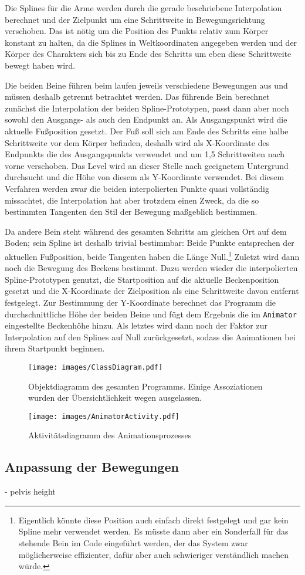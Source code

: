 Die Splines für die Arme werden durch die gerade beschriebene Interpolation berechnet und der Zielpunkt um eine Schrittweite in Bewegungsrichtung verschoben. Das ist nötig um die Position des Punkts relativ zum Körper konstant zu halten, da die Splines in Weltkoordinaten angegeben werden und der Körper des Charakters sich bis zu Ende des Schritts um eben diese Schrittweite bewegt haben wird.

Die beiden Beine führen beim laufen jeweils verschiedene Bewegungen aus und müssen deshalb getrennt betrachtet werden. Das führende Bein berechnet zunächst die Interpolation der beiden Spline-Prototypen, passt dann aber noch sowohl den Ausgangs- als auch den Endpunkt an. Als Ausgangspunkt wird die aktuelle Fußposition gesetzt. Der Fuß soll sich am Ende des Schritts eine halbe Schrittweite vor dem Körper befinden, deshalb wird als X-Koordinate des Endpunkts die des Ausgangspunkts verwendet und um 1,5 Schrittweiten nach vorne verschoben. Das Level wird an dieser Stelle nach geeignetem Untergrund durchsucht und die Höhe von diesem als Y-Koordinate verwendet. Bei diesem Verfahren werden zwar die beiden interpolierten Punkte quasi vollständig missachtet, die Interpolation hat aber trotzdem einen Zweck, da die so bestimmten Tangenten den Stil der Bewegung maßgeblich bestimmen.

Da andere Bein steht während des gesamten Schritts am gleichen Ort auf dem Boden; sein Spline ist deshalb trivial bestimmbar: Beide Punkte entsprechen der aktuellen Fußposition, beide Tangenten haben die Länge Null.\footnote{Eigentlich könnte diese Position auch einfach direkt festgelegt und gar kein Spline mehr verwendet werden. Es müsste dann aber ein Sonderfall für das stehende Bein im Code eingeführt werden, der das System zwar möglicherweise effizienter, dafür aber auch schwieriger verständlich machen würde.} Zuletzt wird dann noch die Bewegung des Beckens bestimmt. Dazu werden wieder die interpolierten Spline-Prototypen genutzt, die Startposition auf die aktuelle Beckenposition gesetzt und die X-Koordinate der Zielposition als eine Schrittweite davon entfernt festgelegt. Zur Bestimmung der Y-Koordinate berechnet das Programm die durchschnittliche Höhe der beiden Beine und fügt dem Ergebnis die im \lstinline{Animator} eingestellte Beckenhöhe hinzu. Als letztes wird dann noch der Faktor zur Interpolation auf den Splines auf Null zurückgesetzt, sodass die Animationen bei ihrem Startpunkt beginnen.



\begin{landscape}
    \begin{figure}
        \texttt{[image: images/ClassDiagram.pdf]}
        \caption{Objektdiagramm des gesamten Programms. Einige Assoziationen wurden der Übersichtlichkeit wegen ausgelassen.}
        \label{uml_classes}
    \end{figure}
\end{landscape}

\begin{figure}
    \centering
    \texttt{[image: images/AnimatorActivity.pdf]}
    \caption{Aktivitätsdiagramm des Animationsprozesses}
    \label{uml_activity}
\end{figure}

\subsection{Anpassung der Bewegungen}

- pelvis height


